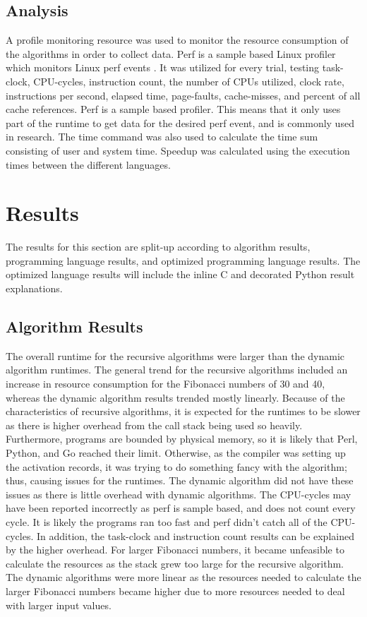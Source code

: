 \documentclass{sig-alternate}
\begin{document}
\subsection{Analysis}

A profile monitoring resource was used to monitor the resource consumption of the algorithms in order to collect data. Perf is a sample based Linux profiler which monitors Linux perf events \cite{perf}. It was utilized for every trial, testing task-clock, CPU-cycles, instruction count, the number of CPUs utilized, clock rate, instructions per second, elapsed time, page-faults, cache-misses, and percent of all cache references. Perf is a sample based profiler. This means that it only uses part of the runtime to get data for the desired perf event, and is commonly used in research. The time command was also used to calculate the time sum consisting of user and system time. Speedup was calculated using the execution times between the different languages.

\section{Results}

The results for this section are split-up according to algorithm results, programming language results, and optimized programming language results. The optimized language results will include the inline C and decorated Python result explanations.

\subsection{Algorithm Results}

The overall runtime for the recursive algorithms were larger than the dynamic algorithm runtimes. The general trend for the recursive algorithms included an increase in resource consumption for the Fibonacci numbers of 30 and 40, whereas the dynamic algorithm results trended mostly linearly. Because of the characteristics of recursive algorithms, it is expected for the runtimes to be slower as there is higher overhead from the call stack being used so heavily. Furthermore, programs are bounded by physical memory, so it is likely that Perl, Python, and Go reached their limit. Otherwise, as the compiler was setting up the activation records, it was trying to do something fancy with the algorithm; thus, causing issues for the runtimes. The dynamic algorithm did not have these issues as there is little overhead with dynamic algorithms. The CPU-cycles may have been reported incorrectly as perf is sample based, and does not count every cycle. It is likely the programs ran too fast and perf didn’t catch all of the CPU-cycles. In addition, the task-clock and instruction count results can be explained by the higher overhead. For larger Fibonacci numbers, it became unfeasible to calculate the resources as the stack grew too large for the recursive algorithm. The dynamic algorithms were more linear as the resources needed to calculate the larger Fibonacci numbers became higher due to more resources needed to deal with larger input values.
\end{document}
